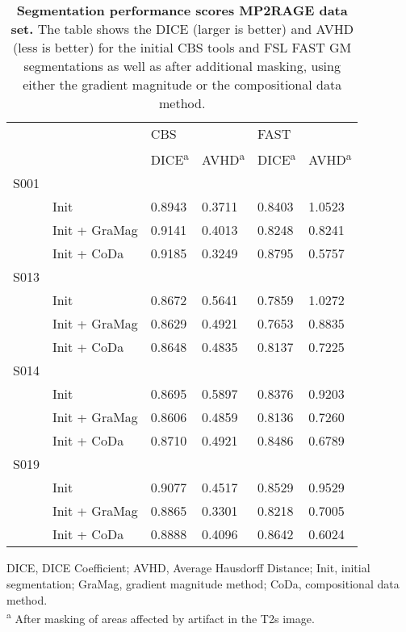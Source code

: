 \begin{table}[!ht]
\centering
\caption{
{\bf Segmentation performance scores MP2RAGE data set.} The table shows the DICE (larger is better) and AVHD (less is better) for the initial CBS tools and FSL FAST GM segmentations as well as after additional masking, using either the gradient magnitude or the compositional data method.}
\begin{tabular}{llllll}
\hline
     &                 & \vline CBS &           & \vline FAST  &   \\
     &                 & \vline DICE\textsuperscript{a} & AVHD\textsuperscript{a} & \vline DICE\textsuperscript{a} & AVHD\textsuperscript{a} \\
\hline
 S001 &                &            &            &             &             \\
      & Init           & 0.8943     & 0.3711     & 0.8403      & 1.0523      \\
      & Init + GraMag  & 0.9141     & 0.4013     & 0.8248      & 0.8241      \\
      & Init + CoDa    & 0.9185     & 0.3249     & 0.8795      & 0.5757      \\
 S013 &                &            &            &             &             \\
      & Init           & 0.8672     & 0.5641     & 0.7859      & 1.0272      \\
      & Init + GraMag  & 0.8629     & 0.4921     & 0.7653      & 0.8835      \\
      & Init + CoDa    & 0.8648     & 0.4835     & 0.8137      & 0.7225      \\
 S014 &                &            &            &             &             \\
      & Init           & 0.8695     & 0.5897     & 0.8376      & 0.9203      \\
      & Init + GraMag  & 0.8606     & 0.4859     & 0.8136      & 0.7260      \\
      & Init + CoDa    & 0.8710     & 0.4921     & 0.8486      & 0.6789      \\
 S019 &                &            &            &             &             \\
      & Init           & 0.9077     & 0.4517     & 0.8529      & 0.9529      \\
      & Init + GraMag  & 0.8865     & 0.3301     & 0.8218      & 0.7005      \\
      & Init + CoDa    & 0.8888     & 0.4096     & 0.8642      & 0.6024      \\
\hline
\end{tabular}
\begin{flushleft}
DICE, DICE Coefficient; AVHD, Average Hausdorff Distance; Init, initial segmentation; GraMag, gradient magnitude method; CoDa, compositional data method.\\
\textsuperscript{a} After masking of areas affected by artifact in the T2s image.
\end{flushleft}
\label{table2}
\end{table}

